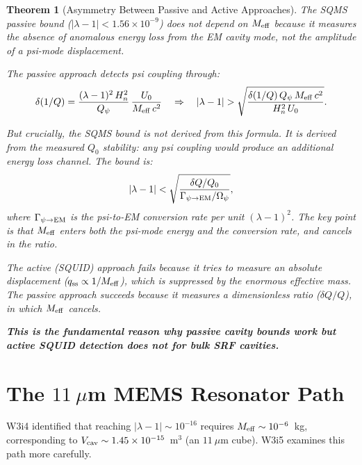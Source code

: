 \documentclass[11pt,twocolumn]{article}
\newcommand{\lam}{\lambda}
\newcommand{\Opsi}{\Omega_\psi}
\newcommand{\Meff}{M_{\rm eff}}
\newcommand{\ee}[1]{\times 10^{#1}}
\newcommand{\Heff}{H_n}
\newcommand{\Vcav}{V_{\rm cav}}
\newtheorem{theorem}{Theorem}[section]
\theoremstyle{definition}
\theoremstyle{remark}
\begin{document}
\begin{theorem}[Asymmetry Between Passive and Active Approaches]
\label{thm:asymmetry}
The SQMS passive bound ($|\lam-1| < 1.56\ee{-9}$) does not depend on $\Meff$
because it measures the \emph{absence of anomalous energy loss} from the
EM cavity mode, not the \emph{amplitude of a psi-mode displacement}.

The passive approach detects psi coupling through:
\begin{equation}
\delta(1/Q) = \frac{(\lam-1)^2\,\Heff^2}{Q_\psi}\,\frac{U_0}{\Meff\,c^2}
\quad \Rightarrow \quad
|\lam-1| > \sqrt{\frac{\delta(1/Q)\,Q_\psi\,\Meff\,c^2}{\Heff^2\,U_0}}.
\label{eq:passive_bound}
\end{equation}

But crucially, the SQMS bound is \emph{not} derived from this formula.
It is derived from the measured $Q_0$ stability: any psi coupling would
produce an additional energy loss channel. The bound is:
\begin{equation}
|\lam-1| < \sqrt{\frac{\delta Q/Q_0}{\Gamma_{\psi\to{\rm EM}}/\Opsi}},
\label{eq:passive_actual}
\end{equation}
where $\Gamma_{\psi\to{\rm EM}}$ is the psi-to-EM conversion rate per unit
$(\lam-1)^2$. The key point is that $\Meff$ enters \emph{both} the
psi-mode energy and the conversion rate, and cancels in the ratio.

The active (SQUID) approach fails because it tries to measure an
\emph{absolute displacement} ($q_{\rm ss} \propto 1/\Meff$), which is
suppressed by the enormous effective mass. The passive approach succeeds
because it measures a \emph{dimensionless ratio} ($\delta Q/Q$), in which
$\Meff$ cancels.

\textbf{This is the fundamental reason why passive cavity bounds work but
active SQUID detection does not for bulk SRF cavities.}
\end{theorem}

\section{The $11~\mu$m MEMS Resonator Path}
\label{sec:mems}

W3i4 identified that reaching $|\lam-1| \sim 10^{-16}$ requires
$\Meff \sim 10^{-6}$~kg, corresponding to $\Vcav \sim 1.45\ee{-15}$~m$^3$
(an $11~\mu$m cube). W3i5 examines this path more carefully.
\end{document}
